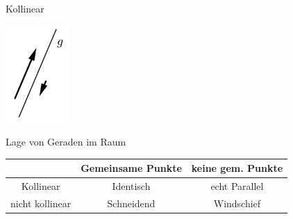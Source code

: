 \begin{definition}{Kollinear}
\begin{minipage}{0.1\linewidth}
        \includegraphics[width=1\linewidth]{vec-kollinear.png}
    \end{minipage}
\end{definition}

\begin{theorem}{Lage} von Geraden im Raum\\
    \vspace*{2mm}
    \begin{tabular}{c|c|c|}
        & Gemeinsame Punkte & keine gem. Punkte \\
        \hline
        Kollinear & Identisch & echt Parallel \\
        \hline
        nicht kollinear & Schneidend & Windschief \\
        \hline
    \end{tabular}
\end{theorem}

